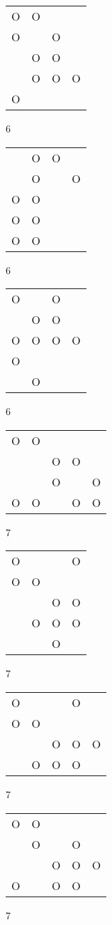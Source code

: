 \begin{tabular}{|m{0.2cm}m{0.2cm}m{0.2cm}m{0.2cm}|}\hline
O&O& & \\
O& &O& \\
 &O&O& \\
 &O&O&O\\
O& & & \\
\hline\end{tabular}6
\begin{tabular}{|m{0.2cm}m{0.2cm}m{0.2cm}m{0.2cm}|}\hline
 &O&O& \\
 &O& &O\\
O&O& & \\
O&O& & \\
O&O& & \\
\hline\end{tabular}6
\begin{tabular}{|m{0.2cm}m{0.2cm}m{0.2cm}m{0.2cm}|}\hline
O& &O& \\
 &O&O& \\
O&O&O&O\\
O& & & \\
 &O& & \\
\hline\end{tabular}6
\begin{tabular}{|m{0.2cm}m{0.2cm}m{0.2cm}m{0.2cm}m{0.2cm}|}\hline
O&O& & & \\
 & &O&O& \\
 & &O& &O\\
O&O& &O&O\\
\hline\end{tabular}7
\begin{tabular}{|m{0.2cm}m{0.2cm}m{0.2cm}m{0.2cm}|}\hline
O& & &O\\
O&O& & \\
 & &O&O\\
 &O&O&O\\
 & &O& \\
\hline\end{tabular}7
\begin{tabular}{|m{0.2cm}m{0.2cm}m{0.2cm}m{0.2cm}m{0.2cm}|}\hline
O& & &O& \\
O&O& & & \\
 & &O&O&O\\
 &O&O&O& \\
\hline\end{tabular}7
\begin{tabular}{|m{0.2cm}m{0.2cm}m{0.2cm}m{0.2cm}m{0.2cm}|}\hline
O&O& & & \\
 &O& &O& \\
 & &O&O&O\\
O& &O&O& \\
\hline\end{tabular}7
